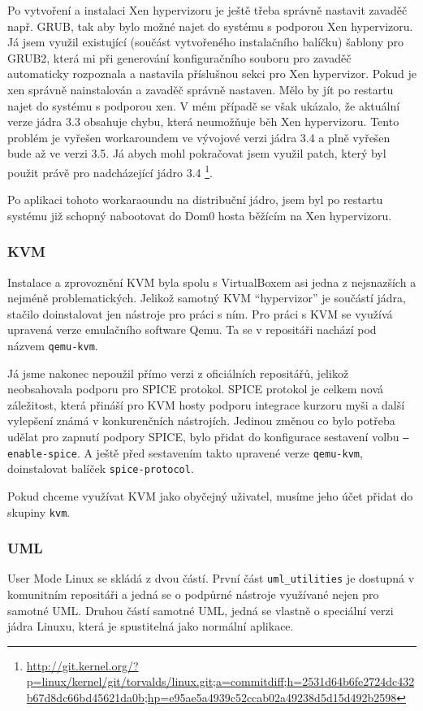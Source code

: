 Po vytvoření a instalaci Xen hypervizoru je ještě třeba správně nastavit zavaděč např. GRUB, tak aby bylo možné najet do systému s podporou Xen hypervizoru. Já jsem využil existující (součást vytvořeného instalačního balíčku) šablony pro GRUB2, která mi při generování konfiguračního souboru pro zavaděč automaticky rozpoznala a nastavila příslušnou sekci pro Xen hypervizor.
\newpage
Pokud je xen správně nainstalován a zavaděč správně nastaven. Mělo by jít po restartu najet do systému s podporou xen. V mém případě se však ukázalo, že aktuální verze jádra 3.3 obsahuje chybu, která neumožňuje běh Xen hypervizoru. Tento problém je vyřešen workaroundem ve vývojové verzi jádra 3.4 a plně vyřešen bude až ve verzi 3.5. Já abych mohl pokračovat jsem využil patch, který byl použit právě pro nadcházející jádro 3.4 \footnote{\url{http://git.kernel.org/?p=linux/kernel/git/torvalds/linux.git;a=commitdiff;h=2531d64b6fe2724dc432b67d8dc66bd45621da0b;hp=e95ae5a4939c52ccab02a49238d5d15d492b2598}}.

Po aplikaci tohoto workaraoundu na distribuční jádro, jsem byl po restartu systému již schopný nabootovat do Dom0 hosta běžícím na Xen hypervizoru.

\subsubsection{KVM}
Instalace a zprovoznění KVM byla spolu s VirtualBoxem asi jedna z nejsnazších a nejméně problematických. Jelikož samotný KVM "`hypervizor"' je součástí jádra, stačilo doinstalovat jen nástroje pro práci s ním. Pro práci s KVM se využívá upravená verze emulačního software Qemu. Ta se v repositáři nachází pod názvem \texttt{qemu-kvm}.

Já jsme nakonec nepoužil přímo verzi z oficiálních repositářů, jelikož neobsahovala podporu pro SPICE protokol. SPICE protokol je celkem nová záležitost, která přináší pro KVM hosty podporu integrace kurzoru myši a další vylepšení známá v konkurenčních nástrojích. Jedinou změnou co bylo potřeba udělat pro zapnutí podpory SPICE, bylo přidat do konfigurace sestavení volbu \texttt{---enable-spice}. A ještě před sestavením takto upravené verze \texttt{qemu-kvm}, doinstalovat balíček \texttt{spice-protocol}.

Pokud chceme využívat KVM jako obyčejný uživatel, musíme jeho účet přidat do skupiny \texttt{kvm}.

\subsubsection{UML}
User Mode Linux se skládá z dvou částí. První část \texttt{uml\_utilities} je dostupná v komunitním repositáři a jedná se o podpůrné nástroje využívané nejen pro samotné UML. Druhou částí samotné UML, jedná se vlastně o speciální verzi jádra Linuxu, která je spustitelná jako normální aplikace.


